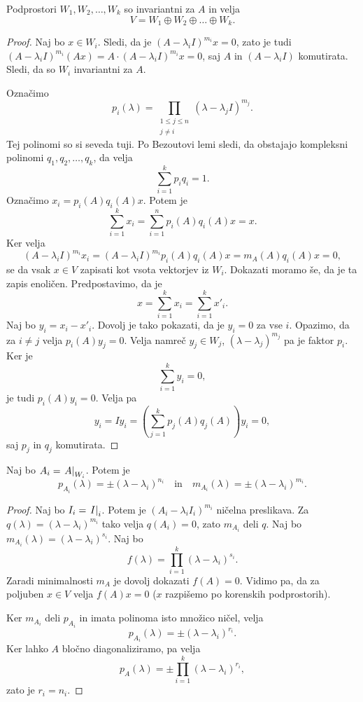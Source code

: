 \documentclass[12pt, a4paper]{article}
\begin{document}
\begin{trditev}
Podprostori $W_1,W_2,\dots,W_k$ so invariantni za $A$ in velja
\[
V=W_1\oplus W_2\oplus\dots\oplus W_k.
\]
\end{trditev}

\begin{proof}
Naj bo $x\in W_i$. Sledi, da je $(A-\lambda_i I)^{m_i}x=0$, zato je tudi $(A-\lambda_i I)^{m_i}(Ax)=A\cdot (A-\lambda_i I)^{m_i}x=0$, saj $A$ in $(A-\lambda_i I)$ komutirata. Sledi, da so $W_i$ invariantni za $A$.

Označimo
\[
p_i(\lambda)=\prod_{\substack{1\leq j\leq n \\ j\ne i}}(\lambda-\lambda_j I)^{m_j}.
\]
Tej polinomi so si seveda tuji. Po Bezoutovi lemi sledi, da obstajajo kompleksni polinomi $q_1,q_2,\dots,q_k$, da velja
\[
\sum_{i=1}^k p_iq_i=1.
\]
Označimo $x_i=p_i(A)q_i(A)x$. Potem je
\[
\sum_{i=1}^k x_i=\sum_{i=1}^n p_i(A)q_i(A)x=x.
\]
Ker velja
\[
(A-\lambda_i I)^{m_i}x_i=(A-\lambda_i I)^{m_i}p_i(A)q_i(A)x=m_A(A)q_i(A)x=0,
\]
se da vsak $x\in V$ zapisati kot vsota vektorjev iz $W_i$. Dokazati moramo še, da je ta zapis enoličen. Predpostavimo, da je
\[
x=\sum_{i=1}^k x_i=\sum_{i=1}^k x'_i.
\]
Naj bo $y_i=x_i-x'_i$. Dovolj je tako pokazati, da je $y_i=0$ za vse $i$. Opazimo, da za $i\ne j$ velja $p_i(A)y_j=0$. Velja namreč $y_j\in W_j$, $(\lambda-\lambda_j)^{m_j}$ pa je faktor $p_i$. Ker je
\[
\sum_{i=1}^k y_i=0,
\]
je tudi $p_i(A)y_i=0$. Velja pa
\[
y_i=Iy_i=\left(\sum_{j=1}^k p_j(A)q_j(A)\right)y_i=0,
\]
saj $p_j$ in $q_j$ komutirata.
\end{proof}

\begin{trditev}
Naj bo $A_i=\left. A\right|_{W_i}^{}$. Potem je
\[
p_{A_i}(\lambda)=\pm(\lambda-\lambda_i)^{n_i}\quad\text{in}\quad m_{A_i}(\lambda)=\pm(\lambda-\lambda_i)^{m_i}.
\]
\end{trditev}

\begin{proof}
Naj bo $I_i=\left. I\right|_{i}^{}$. Potem je $(A_i-\lambda_iI_i)^{m_i}$ ničelna preslikava. Za $q(\lambda)=(\lambda-\lambda_i)^{m_i}$ tako velja $q(A_i)=0$, zato $m_{A_i}$ deli $q$. Naj bo $m_{A_i}(\lambda)=(\lambda-\lambda_i)^{s_i}$. Naj bo
\[
f(\lambda)=\prod_{i=1}^k(\lambda-\lambda_i)^{s_i}.
\]
Zaradi minimalnosti $m_A$ je dovolj dokazati $f(A)=0$. Vidimo pa, da za poljuben $x\in V$ velja $f(A)x=0$ ($x$ razpišemo po korenskih podprostorih).

Ker $m_{A_i}$ deli $p_{A_i}$ in imata polinoma isto množico ničel, velja
\[
p_{A_i}(\lambda)=\pm(\lambda-\lambda_i)^{r_i}.
\]
Ker lahko $A$ bločno diagonaliziramo, pa velja
\[
p_A(\lambda)=\pm\prod_{i=1}^k(\lambda-\lambda_i)^{r_i},
\]
zato je $r_i=n_i$.
\end{proof}
\end{document}
